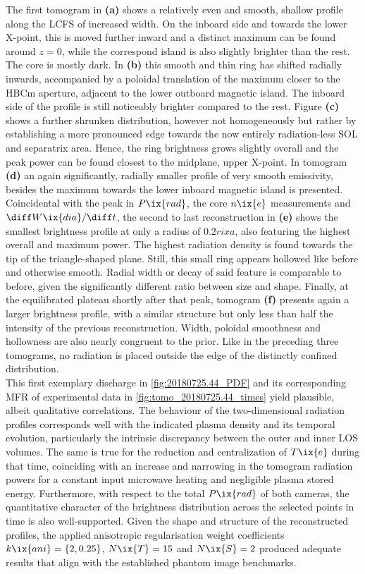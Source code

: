             The first tomogram in \textbf{(a)} shows a relatively even and smooth, shallow profile along the LCFS of increased width. On the inboard side and towards the lower X-point, this is moved further inward and a distinct maximum can be found around $z=0$, while the correspond island is also slightly brighter than the rest. The core is mostly dark. In \textbf{(b)} this smooth and thin ring has shifted radially inwards, accompanied by a poloidal translation of the maximum closer to the HBCm aperture, adjacent to the lower outboard magnetic island. The inboard side of the profile is still noticeably brighter compared to the rest. Figure \textbf{(c)} shows a further shrunken distribution, however not homogeneously but rather by establishing a more pronounced edge towards the now entirely radiation-less SOL and separatrix area. Hence, the ring brightness grows slightly overall and the peak power can be found closest to the midplane, upper X-point. In tomogram \textbf{(d)} an again significantly, radially smaller profile of very smooth emissivity, besides the maximum towards the lower inboard magnetic island is presented. Coincidental with the peak in $P\ix{rad}$, the core $n\ix{e}$ measurements and $\diff W\ix{dia}/\diff t$, the second to last reconstruction in \textbf{(e)} shows the smallest brightness profile at only a radius of $0.2rix{a}$, also featuring the highest overall and maximum power. The highest radiation density is found towards the tip of the triangle-shaped plane. Still, this small ring appears hollowed like before and otherwise smooth. Radial width or decay of said feature is comparable to before, given the significantly different ratio between size and shape. Finally, at the equilibrated plateau shortly after that peak, tomogram \textbf{(f)} presents again a larger brightness profile, with a similar structure but only less than half the intensity of the previous reconstruction. Width, poloidal smoothness and hollowness are also nearly congruent to the prior. Like in the preceding three tomograms, no radiation is placed outside the edge of the distinctly confined distribution.\\%
            This first exemplary discharge in \cref{fig:20180725.44_PDF} and its corresponding MFR of experimental data in \cref{fig:tomo_20180725.44_times} yield plausible, albeit qualitative correlations. The behaviour of the two-dimensional radiation profiles corresponds well with the indicated plasma density and its temporal evolution, particularly the intrinsic discrepancy between the outer and inner LOS volumes. The same is true for the reduction and centralization of $T\ix{e}$ during that time, coinciding with an increase and narrowing in the tomogram radiation powers for a constant input microwave heating and negligible plasma stored energy. Furthermore, with respect to the total $P\ix{rad}$ of both cameras, the quantitative character of the brightness distribution across the selected points in time is also well-supported. Given the shape and structure of the reconstructed profiles, the applied anisotropic regularisation weight coefficients $k\ix{ani}=\left\{2, 0.25\right\}$, $N\ix{T}=15$ and $N\ix{S}=2$ produced adequate results that align with the established phantom image benchmarks.%
%
